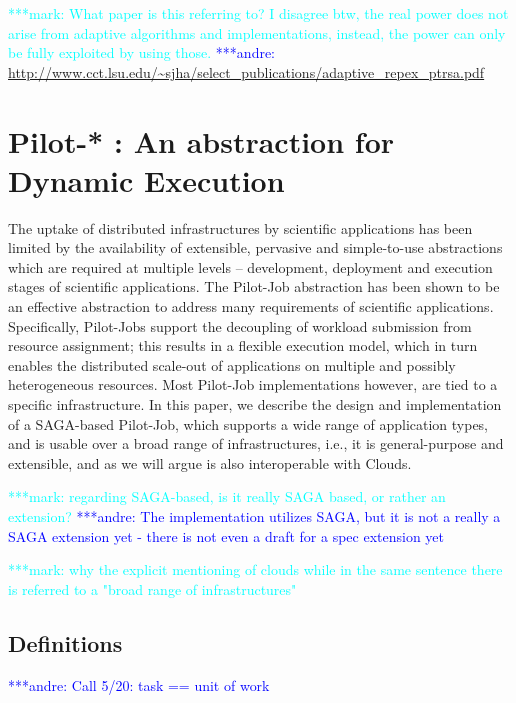 \documentclass[]{article}
\newcommand{\jhanote}[1]{ {\textcolor{red} { ***shantenu: #1 }}}
\newcommand{\alnote}[1]{ {\textcolor{blue} { ***andre: #1 }}}
\newcommand{\msnote}[1]{ {\textcolor{cyan} { ***mark: #1 }}}
\newcommand{\alnote}[1]{}
\begin{document}
\msnote{What paper is this referring to? I disagree btw, the real power does not arise from adaptive algorithms and implementations, instead, the power can only be fully exploited by using those.}\alnote{\url{http://www.cct.lsu.edu/~sjha/select_publications/adaptive_repex_ptrsa.pdf}}

\section{Pilot-* : An abstraction for Dynamic Execution}

The uptake of distributed infrastructures by scientific applications
has been limited by the availability of extensible, pervasive and
simple-to-use abstractions which are required at multiple levels –
development, deployment and execution stages of scientific
applications. The Pilot-Job abstraction has been shown to be an
effective abstraction to address many requirements of scientific
applications. Specifically, Pilot-Jobs support the decoupling of
workload submission from resource assignment; this results in a
flexible execution model, which in turn enables the distributed
scale-out of applications on multiple and possibly heterogeneous
resources. Most Pilot-Job implementations however, are tied to a
specific infrastructure. In this paper, we describe the design and
implementation of a SAGA-based Pilot-Job, which supports a wide range
of application types, and is usable over a broad range of
infrastructures, i.e., it is general-purpose and extensible, and as we
will argue is also interoperable with Clouds.

\msnote{regarding SAGA-based, is it really SAGA based, or rather an
  extension?}\alnote{The implementation utilizes SAGA, but it is not a
  really a SAGA extension yet - there is not even a draft for a spec
  extension yet}

\msnote{why the explicit mentioning of clouds while in the same sentence there is referred to a "broad range of infrastructures"}

\subsection{Definitions}


  \alnote{Call 5/20: task == unit of work}
\end{document}
